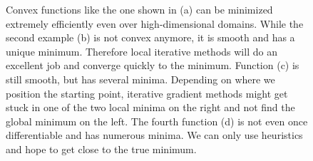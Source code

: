 \begin{figure}
  \centering
  \caption{Convex functions like the one shown in (a) can be minimized extremely
  efficiently even over high-dimensional domains. While the second example (b)
  is not convex anymore, it is smooth and has a unique minimum. Therefore local
  iterative methods will do an excellent job and converge quickly to the
  minimum. Function (c) is still smooth, but has several minima. Depending on
  where we position the starting point, iterative gradient methods might get
  stuck in one of the two local minima on the right and not find the global
  minimum on the left. The fourth function (d) is not even once differentiable
  and has numerous minima. We can only use heuristics and hope to get close to
  the true minimum.}
\label{fig:samplefuncs}
\end{figure}

